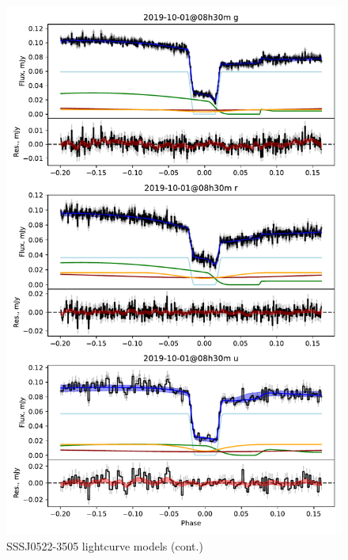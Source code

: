 \begin{figure}
    \centering
    \includegraphics[width=\textwidth]{figures/results/three_cvs_with_weird_colours/SSS111126/SSS111126_2.pdf}
    \caption{SSSJ0522-3505 lightcurve models (cont.)}
    \label{fig:SSSJ0522-3505 all lightcurves cont 1}
\end{figure}
